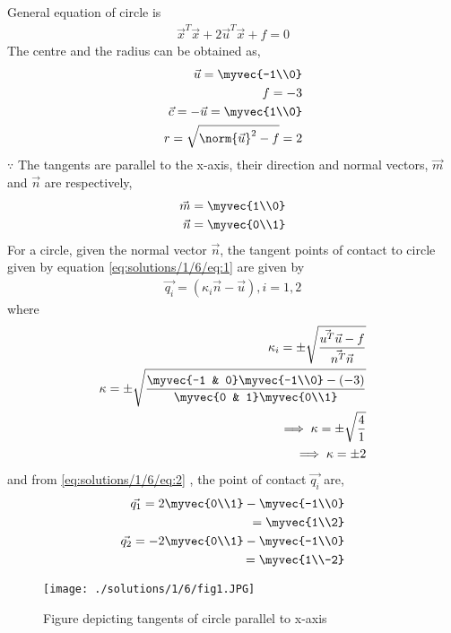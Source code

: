 General equation of circle is 
\begin{align}
    \vec{x}^T\vec{x}+ 2\vec{u}^T\vec{x}+f = 0
    \label{eq:solutions/1/6/eq:1}
\end{align}
The centre and the radius can be obtained as,
 \begin{align}
\vec{u}=\myvec{-1\\0}\\
f=-3\\
\vec{c}=-\vec{u}=\myvec{1\\0}\\
 r=\sqrt{\norm{\vec{u}}^2-f}=2
 \end{align}
$\because$ The tangents are parallel to the x-axis, their direction and normal vectors, $\vec{m}$ and $\vec{n}$ are respectively,
\begin{align}
\vec{m}=\myvec{1\\0}\\
\vec{n}=\myvec{0\\1}
\end{align}
For a circle, given the normal vector $\vec{n}$, the tangent points of contact to circle given by equation \eqref{eq:solutions/1/6/eq:1}  are given by
\begin{align}
    \vec{q_i}=(\kappa_i \vec{n}-\vec{u}), i=1,2
    \label{eq:solutions/1/6/eq:2}
\end{align}
where
\begin{align}
    \kappa_i=\pm \sqrt{\frac{\vec{u^T}\vec{u}-f}{\vec{n^T}\vec{n}}}\\
    \kappa=\pm \sqrt{\frac{\myvec{-1 & 0}\myvec{-1\\0}-(-3)}{\myvec{0 & 1} \myvec{0\\1}}}\\
 \implies \kappa=\pm \sqrt{\frac{4}{1}}\\
    \implies \kappa=\pm 2      
\end{align}
and from \eqref{eq:solutions/1/6/eq:2} , the point of contact $\vec{q_i}$ are,
\begin{align}
    \vec{q_1}=2\myvec{0\\1}-\myvec{-1\\0}\\
    =\myvec{1\\2}\\
    \vec{q_2}=-2\myvec{0\\1}-\myvec{-1\\0}\\
    =\myvec{1\\-2}
\end{align}
 \begin{figure}[h!]
	\centering
	\texttt{[image: ./solutions/1/6/fig1.JPG]}
	\caption{Figure depicting tangents of circle parallel to x-axis}
	\label{eq:solutions/1/6/fig1}
\end{figure}
